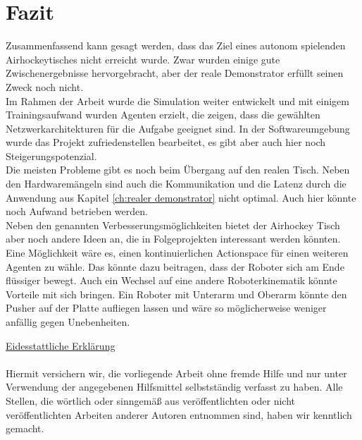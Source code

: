 \chapter{Fazit}  
\label{ch:Fazit}
Zusammenfassend kann gesagt werden, dass das Ziel eines autonom spielenden Airhockeytisches nicht erreicht wurde. Zwar wurden einige gute Zwischenergebnisse hervorgebracht, aber der reale Demonstrator erfüllt seinen Zweck noch nicht.\\
Im Rahmen der Arbeit wurde die Simulation weiter entwickelt und mit einigem Trainingsaufwand wurden Agenten erzielt, die zeigen, dass die gewählten Netzwerkarchitekturen für die Aufgabe geeignet sind. In der Softwareumgebung wurde das Projekt zufriedenstellen bearbeitet, es gibt aber auch hier noch Steigerungspotenzial.\\
Die meisten Probleme gibt es noch beim Übergang auf den realen Tisch. Neben den Hardwaremängeln sind auch die Kommunikation und die Latenz durch die Anwendung aus Kapitel \ref{ch:realer demonstrator} nicht optimal. Auch hier könnte noch Aufwand betrieben werden.\\
Neben den genannten Verbesserungsmöglichkeiten bietet der Airhockey Tisch aber noch andere Ideen an, die in Folgeprojekten interessant werden könnten. Eine Möglichkeit wäre es, einen kontinuierlichen Actionspace für einen weiteren Agenten zu wähle. Das könnte dazu beitragen, dass der Roboter sich am Ende flüssiger bewegt. Auch ein Wechsel auf eine andere Roboterkinematik könnte Vorteile mit sich bringen. Ein Roboter mit Unterarm und Oberarm könnte den Pusher auf der Platte aufliegen lassen und wäre so möglicherweise weniger anfällig gegen Unebenheiten.


\newpage
\underline{Eidesstattliche Erklärung}\\\\
Hiermit versichern wir, die vorliegende Arbeit ohne fremde Hilfe und nur unter Verwendung
der angegebenen Hilfsmittel selbstständig verfasst zu haben. Alle Stellen, die wörtlich oder
sinngemäß aus veröffentlichten oder nicht veröffentlichten Arbeiten anderer Autoren entnommen sind, haben wir kenntlich gemacht.

